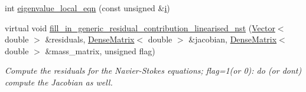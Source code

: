 \begin{DoxyCompactItemize}
int \hyperlink{classoomph_1_1LinearisedNavierStokesEquations_a8c1fd588985991377b112c7535d35fa7}{eigenvalue\+\_\+local\+\_\+eqn} (const unsigned \&\hyperlink{cfortran_8h_adb50e893b86b3e55e751a42eab3cba82}{i})
\item 
virtual void \hyperlink{classoomph_1_1LinearisedNavierStokesEquations_a9f6b557aa6599c067c042bc076a3bf8d}{fill\+\_\+in\+\_\+generic\+\_\+residual\+\_\+contribution\+\_\+linearised\+\_\+nst} (\hyperlink{classoomph_1_1Vector}{Vector}$<$ double $>$ \&residuals, \hyperlink{classoomph_1_1DenseMatrix}{Dense\+Matrix}$<$ double $>$ \&jacobian, \hyperlink{classoomph_1_1DenseMatrix}{Dense\+Matrix}$<$ double $>$ \&mass\+\_\+matrix, unsigned flag)
\begin{DoxyCompactList}\small\item\em Compute the residuals for the Navier-\/\+Stokes equations; flag=1(or 0)\+: do (or don\textquotesingle{}t) compute the Jacobian as well. \end{DoxyCompactList}\end{DoxyCompactItemize}
